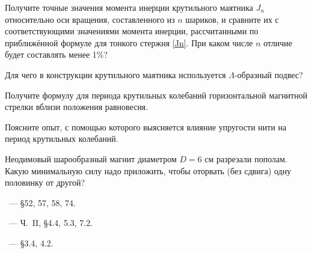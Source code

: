 \begin{lab:questions}
\item Получите точные значения момента инерции крутильного маятника $J_n$
относительно оси вращения, составленного из  $n$ шариков, и сравните
их с соответствующими значениями момента инерции, рассчитанными по приближённой
формуле для тонкого стержня \eqref{Jn}. При каком числе $n$
отличие будет составлять менее 1\%?

\item Для чего в конструкции крутильного маятника используется $\Lambda$-образный
подвес?

\item Получите формулу для периода крутильных колебаний горизонтальной магнитной
стрелки вблизи положения равновесия.

\item Поясните опыт, с помощью которого выясняется влияние упругости нити на
период крутильных колебаний.

\item Неодимовый шарообразный магнит диаметром $D=6$ см разрезали пополам. Какую
минимальную силу надо приложить, чтобы оторвать (без сдвига) одну половинку от
другой? 


\end{lab:questions}

\begin{lab:literature}
    \item \SivuhinIII~--- \S 52, 57, 58, 74.
    \item \KingLokOlh~--- Ч.~II, \S 4.4, 5.3, 7.2.
    \item \Kirichenko~--- \S 3.4, 4.2.
\end{lab:literature}

